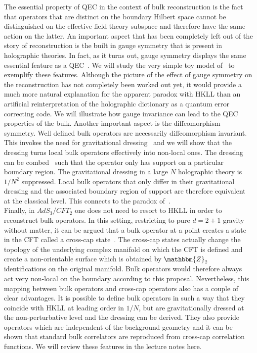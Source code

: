 \documentclass{PoS}
\begin{document}
The essential property of QEC in the context of bulk reconstruction is the fact that operators  that are distinct on the boundary Hilbert space cannot be distinguished on the effective field theory subspace and therefore have the same action on the latter. An important aspect that has been completely left out of the story of reconstruction is the built in gauge symmetry that is present in holographic theories. In fact, as it turns out, gauge symmetry displays the same essential feature as a QEC~\cite{Mintun:2015qda,deBoer:2016yiz,Freivogel:2016zsb}. We will study the very simple toy model of~\cite{Mintun:2015qda} to exemplify these features. Although the picture of the effect of gauge symmetry on the reconstruction has not completely been worked out yet, it would provide a much more natural explanation for the apparent paradox with HKLL than an artificial reinterpretation of the holographic dictionary as a quantum error correcting code. We will illustrate how gauge invariance can lead to the QEC properties of the bulk. Another important aspect is the diffeomorphism symmetry. Well defined bulk operators are necessarily diffeomorphism invariant. This invokes the need for gravitational dressing~\cite{Dirac:1955uv,Donnelly:2015hta} and we will show that the dressing turns local bulk operators effectively into non-local ones. The dressing can be combed~\cite{Donnelly:2015taa} such that the operator only has support on a particular boundary region. The gravitational dressing in a large $N$ holographic theory is $1/N^2$ suppressed. Local bulk operators that only differ in their gravitational dressing and the associated boundary region of support are therefore equivalent at the classical level. This connects to the paradox of~\cite{Almheiri:2014lwa}.\\

Finally, in $AdS_3/CFT_2$ one does not need to resort to HKLL in order to reconstruct bulk operators. In this setting, restricting to pure $d=2+1$ gravity without matter, it can be argued that a bulk operator at a point creates a state in the CFT called a cross-cap state~\cite{Miyaji:2015fia,Nakayama:2015mva,Nakayama:2016xvw,Verlinde:2015qfa,Lewkowycz:2016ukf}. The cross-cap states actually change the topology of the underlying complex manifold on which the CFT is defined and create a non-orientable surface which is obtained by $\mathbbm{Z}_2$ identifications on the original manifold. Bulk operators would therefore always act very non-local on the boundary according to this proposal. Nevertheless, this mapping between bulk operators and cross-cap operators also has a couple of clear advantages. It is possible to define bulk operators in such a way that they coincide with HKLL at leading order in $1/N$, but are gravitationally dressed at the non-perturbative level and the dressing can be derived. They also provide operators which are independent of the background geometry and it can be shown that standard bulk correlators are reproduced from cross-cap correlation functions. We will review these features in the lecture notes here.\\
\end{document}
